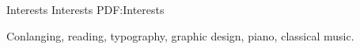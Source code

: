 \documentclass[letterpaper,MMMyyyy,nonstopmode]{simpleresumecv}
\begin{document}
\begin{Body}

%
%


\Section
{Interests}
{Interests}
{PDF:Interests}

\Entry
Conlanging,
reading,
typography,
graphic design,
piano,
classical music.










\end{Body}
\end{document}

